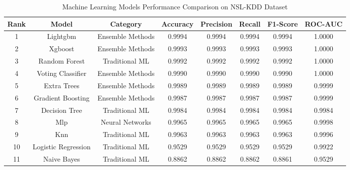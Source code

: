 
\begin{table}[htbp]
\centering
\caption{Machine Learning Models Performance Comparison on NSL-KDD Dataset}
\label{tab:model_performance}
\begin{tabular}{|c|c|c|c|c|c|c|c|}
\hline
\textbf{Rank} & \textbf{Model} & \textbf{Category} & \textbf{Accuracy} & \textbf{Precision} & \textbf{Recall} & \textbf{F1-Score} & \textbf{ROC-AUC} \\
\hline
1 & Lightgbm & Ensemble Methods & 0.9994 & 0.9994 & 0.9994 & 0.9994 & 1.0000 \\
2 & Xgboost & Ensemble Methods & 0.9993 & 0.9993 & 0.9993 & 0.9993 & 1.0000 \\
3 & Random Forest & Traditional ML & 0.9992 & 0.9992 & 0.9992 & 0.9992 & 1.0000 \\
4 & Voting Classifier & Ensemble Methods & 0.9990 & 0.9990 & 0.9990 & 0.9990 & 1.0000 \\
5 & Extra Trees & Ensemble Methods & 0.9989 & 0.9989 & 0.9989 & 0.9989 & 0.9999 \\
6 & Gradient Boosting & Ensemble Methods & 0.9987 & 0.9987 & 0.9987 & 0.9987 & 0.9999 \\
7 & Decision Tree & Traditional ML & 0.9984 & 0.9984 & 0.9984 & 0.9984 & 0.9984 \\
8 & Mlp & Neural Networks & 0.9965 & 0.9965 & 0.9965 & 0.9965 & 0.9998 \\
9 & Knn & Traditional ML & 0.9963 & 0.9963 & 0.9963 & 0.9963 & 0.9996 \\
10 & Logistic Regression & Traditional ML & 0.9529 & 0.9529 & 0.9529 & 0.9529 & 0.9922 \\
11 & Naive Bayes & Traditional ML & 0.8862 & 0.8862 & 0.8862 & 0.8861 & 0.9529 \\
\hline
\end{tabular}
\end{table}
